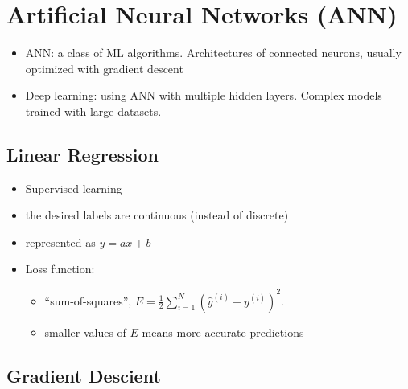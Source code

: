 \documentclass[twocolumn,landscape,10pt]{article}
\theoremstyle{definition}
\begin{document}
\section{Artificial Neural Networks (ANN)}

\begin{itemize}
    \item ANN: a class of ML algorithms. Architectures of connected neurons,
        usually optimized with gradient descent
    \item Deep learning: using ANN with multiple hidden layers. Complex models
        trained with large datasets.
\end{itemize} 

\subsection{Linear Regression}

\begin{itemize}
    \item Supervised learning
    \item the desired labels are continuous (instead of discrete)
    \item represented as $y = ax + b$
    \item Loss function: 
        \begin{itemize}
            \item 
                ``sum-of-squares'', $E=\frac{1}{2}\sum_{i=1}^{N}
                {\left(\hat{y}^{(i)}-y^{(i)}\right)}^{2}$.
            \item 
                smaller values of $E$ means more accurate predictions
        \end{itemize} 
\end{itemize} 

\subsection{Gradient Descient}
\end{document}
